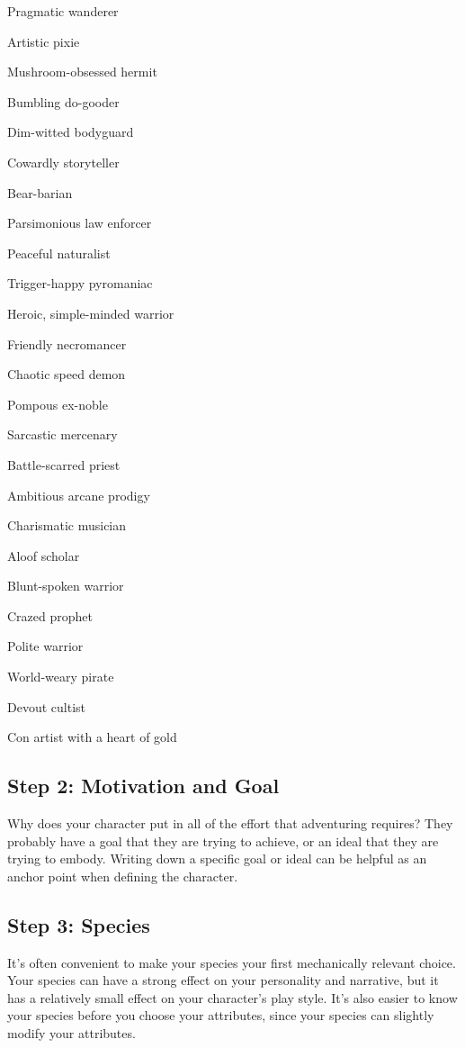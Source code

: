     \begin{raggeditemize}
      \item Pragmatic wanderer
      \item Artistic pixie
      \item Mushroom-obsessed hermit
      \item Bumbling do-gooder
      \item Dim-witted bodyguard
      \item Cowardly storyteller
      \item Bear-barian
      \item Parsimonious law enforcer
      \item Peaceful naturalist
      \item Trigger-happy pyromaniac
      \item Heroic, simple-minded warrior
      \item Friendly necromancer
      \item Chaotic speed demon
      \item Pompous ex-noble
      \item Sarcastic mercenary
      \item Battle-scarred priest
      \item Ambitious arcane prodigy
      \item Charismatic musician
      \item Aloof scholar
      \item Blunt-spoken warrior
      \item Crazed prophet
      \item Polite warrior
      \item World-weary pirate
      \item Devout cultist
      \item Con artist with a heart of gold
    \end{raggeditemize}

  \subsection{Step 2: Motivation and Goal}
    Why does your character put in all of the effort that adventuring requires?
    They probably have a goal that they are trying to achieve, or an ideal that they are trying to embody.
    Writing down a specific goal or ideal can be helpful as an anchor point when defining the character.

  \subsection{Step 3: Species}
    It's often convenient to make your species your first mechanically relevant choice.
    Your species can have a strong effect on your personality and narrative, but it has a relatively small effect on your character's play style.
    It's also easier to know your species before you choose your attributes, since your species can slightly modify your attributes.

